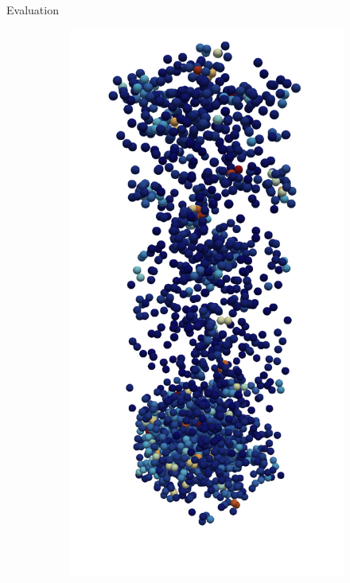 \begin{frame}[c]{Evaluation}{}
{\begin{figure}[htpb]
\begin{subfigure}[c]{.2\textwidth}
				\vspace{-1cm}
			\end{subfigure}%
			\begin{subfigure}[c]{.2\textwidth}
				\centering
				\vspace{-1cm}
				\includegraphics[width=\textwidth]{exploding-liquid/render/t31000.png}

\end{subfigure}
\end{figure}}
\end{frame}
